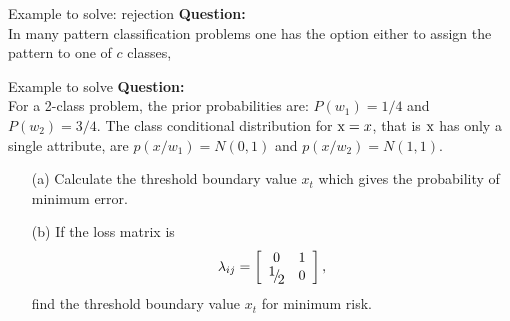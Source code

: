 
%

\begin{frame}{Example to solve: rejection}
\textbf{\color{blue}Question:}\\
In many pattern classification problems one has the option either to assign the pattern to one of $c$ classes,
\end{frame}

\begin{frame}{Example to solve}
\textbf{\color{blue}Question:}\\
For a 2-class problem, the prior probabilities are: $P(w_1)={1}/{4}$
and $P(w_2)={3}/{4}$. The class conditional distribution for ${\rm x}=x$,  that is ${\rm x}$ has only a single attribute, are
$p(x/w_1)=N(0,1)$ and 
$p(x/w_2)=N(1,1)$.
\begin{itemize}
\item[(a)] Calculate the threshold boundary value $x_t$ which gives the probability of minimum error.
\item[(b)] If the loss matrix is 
\begin{equation*}
{\lambda _{ij}} = \left[ {\begin{array}{*{20}{c}}
  0&1 \\ 
  {{\raise0.7ex\hbox{$1$} \!\mathord{\left/
 {\vphantom {1 2}}\right.\kern-\nulldelimiterspace}
\!\lower0.7ex\hbox{$2$}}}&0 
\end{array}} \right],
\end{equation*}
find the threshold boundary value $x_t$ for minimum risk.
\end{itemize}
\end{frame}

